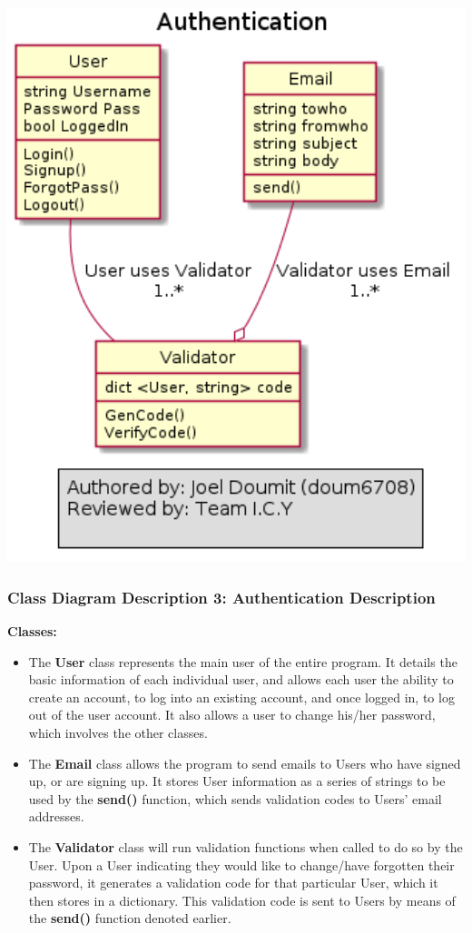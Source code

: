 \documentclass[twoside,letterpaper]{article}
\begin{document}
	\includegraphics[width=6.0in]{images/ClassDiagrams/Authentication}
	
	\newpage
	
	\subsubsection[Class Diagram Description 3: Authentication Description]{\rmfamily\bfseries\color{black}
		Class Diagram Description 3: Authentication Description}
	\hypertarget{RefHeading22059017292}{}
	
	\textbf{Classes:}
	\begin{itemize}
	
		\item The \textbf{User} class represents the main user of the entire program. It details the basic information of each individual user, and allows each user the ability to create an account, to log into an existing account, and once logged in, to log out of the user account. It also allows a user to change his/her password, which involves the other classes.
		\item The \textbf{Email} class allows the program to send emails to Users who have signed up, or are signing up. It stores User information as a series of strings to be used by the \textbf{send()} function, which sends validation codes to Users' email addresses.
		\item The \textbf{Validator} class will run validation functions when called to do so by the User. Upon a User indicating they would like to change/have forgotten their password, it generates a validation code for that particular User, which it then stores in a dictionary. This validation code is sent to Users by means of the \textbf{send()} function denoted earlier.
	\end{itemize}
	
\end{document}
